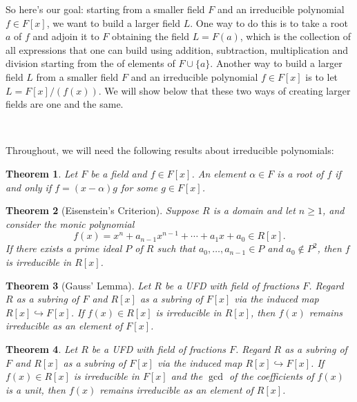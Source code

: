\documentclass[12pt]{report}
\newtheorem{theorem}{Theorem}[chapter]
\numberwithin{equation}{section}
\numberwithin{theorem}{chapter}
\theoremstyle{definition}
\newtheorem*{basic properties}{Basic Properties}
\newtheorem*{Important Remark}{Important Remark}
\begin{document}
So here's our goal: starting from a smaller field $F$ and an irreducible polynomial $f\in F[x]$, we want to build a larger field $L$. One way to do this is to take a root $a$ of $f$ and adjoin it to $F$ obtaining the field $L=F(a)$, which is the collection of all expressions that one can build using addition, subtraction, multiplication and division starting from the of elements of $F\cup\{a\}$.
Another way to build a larger field $L$ from a smaller field $F$ and an irreducible polynomial $f\in F[x]$ is to
let $L=F[x]/(f(x))$. We will show below that these two ways of creating larger fields are one and the same.



\


Throughout, we will need the following results about irreducible polynomials:


\begin{theorem}
	Let $F$ be a field and $f \in F[x]$. An element $\alpha \in F$ is a root of $f$ if and only if $f = (x-\alpha) g$ for some $g \in F[x]$.
\end{theorem}

\begin{theorem}[Eisenstein's Criterion]\label{eisenstein criterion}
Suppose $R$ is a domain and let $n \geqslant 1$, and consider the monic polynomial
$$f(x) = x^n + a_{n-1} x^{n-1} + \cdots + a_1 x + a_0 \in R[x].$$
If there exists a prime ideal $P$ of $R$ such that $a_0, \dots, a_{n-1} \in P$ and $a_0 \notin P^2$, then $f$ is irreducible in $R[x]$.
\end{theorem}


\begin{theorem}[Gauss' Lemma]\label{Gauss Lemma}
Let $R$ be a UFD  with field of fractions $F$. Regard $R$ as a subring of $F$ and $R[x]$ as a subring of $F[x]$ via the induced map $R[x]\hookrightarrow F[x]$.
If $f(x) \in R[x]$ is irreducible  in $R[x]$,  then $f(x)$ remains irreducible  as an element of $F[x]$.
\end{theorem}

\begin{theorem}\label{gauss lemma backwards}
	Let $R$ be a UFD  with field of fractions $F$. Regard $R$ as a subring of $F$ and $R[x]$ as a subring of $F[x]$ via the induced map $R[x]\hookrightarrow F[x]$. If $f(x) \in R[x]$ is irreducible in $F[x]$ and the $\gcd$ of the coefficients of $f(x)$ is a unit, then $f(x)$ remains irreducible as an element of $R[x]$.
\end{theorem}
\end{document}
